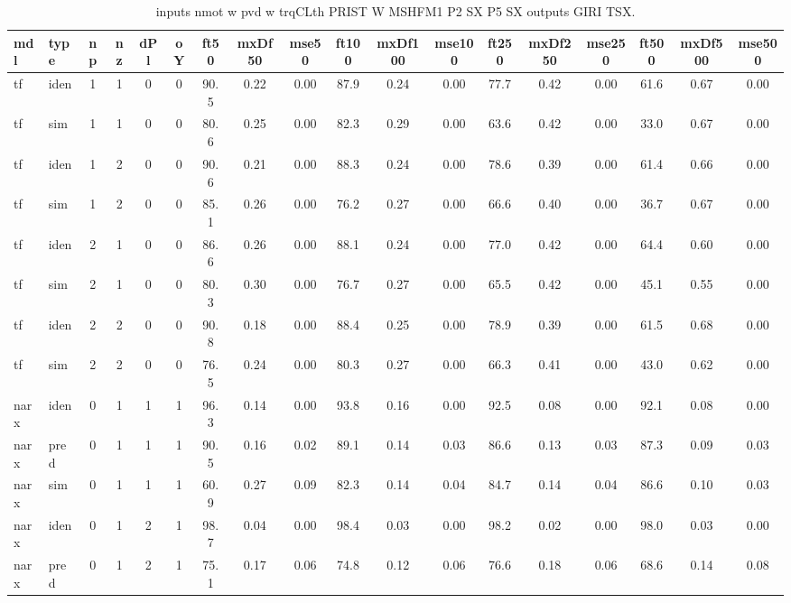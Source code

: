\begin{landscape} 
 \begin{center} 
 \footnotesize 
 \begin{longtable}{ll|cccc|ccc|ccc|ccc|ccc} 
\caption[inputs nmot w pvd w trqCLth PRIST W MSHFM1 P2 SX P5 SX   outputs GIRI TSX]{inputs nmot w pvd w trqCLth PRIST W MSHFM1 P2 SX P5 SX   outputs GIRI TSX.} 
\label{tab:inputs_nmot_w_pvd_w_trqCLth_PRIST_W_MSHFM1_P2_SX_P5_SX___outputs_GIRI_TSX} 
\hline 
  mdl & type & np & nz & dPl & oY & ft50 & mxDf50 & mse50 & ft100 & mxDf100 & mse100 & ft250 & mxDf250 & mse250 & ft500 & mxDf500 & mse500 \\ 
 \hline 
tf  & iden & 1 & 1 & 0 & 0 & 90.5 & 0.22 & 0.00 & 87.9 & 0.24 & 0.00 & 77.7 & 0.42 & 0.00 & 61.6 & 0.67 & 0.00 \\ 
tf  & sim  & 1 & 1 & 0 & 0 & 80.6 & 0.25 & 0.00 & 82.3 & 0.29 & 0.00 & 63.6 & 0.42 & 0.00 & 33.0 & 0.67 & 0.00 \\ 
 \hline 
tf  & iden & 1 & 2 & 0 & 0 & 90.6 & 0.21 & 0.00 & 88.3 & 0.24 & 0.00 & 78.6 & 0.39 & 0.00 & 61.4 & 0.66 & 0.00 \\ 
tf  & sim  & 1 & 2 & 0 & 0 & 85.1 & 0.26 & 0.00 & 76.2 & 0.27 & 0.00 & 66.6 & 0.40 & 0.00 & 36.7 & 0.67 & 0.00 \\ 
 \hline 
tf  & iden & 2 & 1 & 0 & 0 & 86.6 & 0.26 & 0.00 & 88.1 & 0.24 & 0.00 & 77.0 & 0.42 & 0.00 & 64.4 & 0.60 & 0.00 \\ 
tf  & sim  & 2 & 1 & 0 & 0 & 80.3 & 0.30 & 0.00 & 76.7 & 0.27 & 0.00 & 65.5 & 0.42 & 0.00 & 45.1 & 0.55 & 0.00 \\ 
 \hline 
tf  & iden & 2 & 2 & 0 & 0 & 90.8 & 0.18 & 0.00 & 88.4 & 0.25 & 0.00 & 78.9 & 0.39 & 0.00 & 61.5 & 0.68 & 0.00 \\ 
tf  & sim  & 2 & 2 & 0 & 0 & 76.5 & 0.24 & 0.00 & 80.3 & 0.27 & 0.00 & 66.3 & 0.41 & 0.00 & 43.0 & 0.62 & 0.00 \\ 
 \hline 
narx & iden & 0 & 1 & 1 & 1 & 96.3 & 0.14 & 0.00 & 93.8 & 0.16 & 0.00 & 92.5 & 0.08 & 0.00 & 92.1 & 0.08 & 0.00 \\ 
narx & pred & 0 & 1 & 1 & 1 & 90.5 & 0.16 & 0.02 & 89.1 & 0.14 & 0.03 & 86.6 & 0.13 & 0.03 & 87.3 & 0.09 & 0.03 \\ 
narx & sim  & 0 & 1 & 1 & 1 & 60.9 & 0.27 & 0.09 & 82.3 & 0.14 & 0.04 & 84.7 & 0.14 & 0.04 & 86.6 & 0.10 & 0.03 \\ 
 \hline 
narx & iden & 0 & 1 & 2 & 1 & 98.7 & 0.04 & 0.00 & 98.4 & 0.03 & 0.00 & 98.2 & 0.02 & 0.00 & 98.0 & 0.03 & 0.00 \\ 
narx & pred & 0 & 1 & 2 & 1 & 75.1 & 0.17 & 0.06 & 74.8 & 0.12 & 0.06 & 76.6 & 0.18 & 0.06 & 68.6 & 0.14 & 0.08 \\ 

\end{longtable}
\end{center}
\end{landscape}
